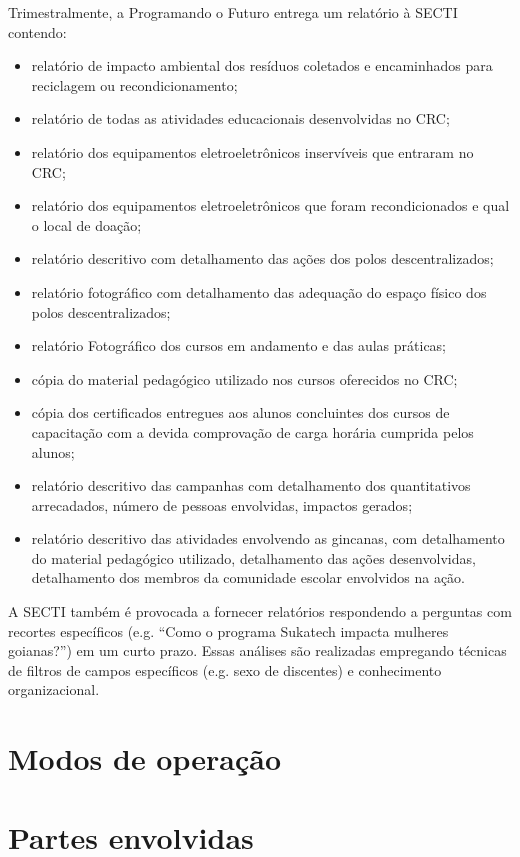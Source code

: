 \documentclass[
	12pt,				%
	openright,			%
	twoside,			%
	a4paper,			%
	english,			%
	french,				%
	spanish,			%
	brazil,				%
	]{abntex2}
\begin{document}
Trimestralmente, a Programando o Futuro entrega um relatório à SECTI contendo:

\begin{itemize}
  \item relatório de impacto ambiental dos resíduos coletados e encaminhados para reciclagem ou recondicionamento;
  \item relatório de todas as atividades educacionais desenvolvidas no CRC;
  \item relatório dos equipamentos eletroeletrônicos inservíveis que entraram no CRC;
  \item relatório dos equipamentos eletroeletrônicos que foram recondicionados e qual o local de doação;
  \item relatório descritivo com detalhamento das ações dos polos descentralizados;
  \item relatório fotográfico com detalhamento das adequação do espaço físico dos polos descentralizados;
  \item relatório Fotográfico dos cursos em andamento e das aulas práticas;
  \item cópia do material pedagógico utilizado nos cursos oferecidos no CRC;
  \item cópia dos certificados entregues aos alunos concluintes dos cursos de capacitação com a devida comprovação de carga horária cumprida pelos alunos;
  \item relatório descritivo das campanhas com detalhamento dos quantitativos arrecadados, número de pessoas envolvidas, impactos gerados;
  \item relatório descritivo das atividades envolvendo as gincanas, com detalhamento do material pedagógico utilizado, detalhamento das ações desenvolvidas, detalhamento dos membros da comunidade escolar envolvidos na ação.
\end{itemize}

A SECTI também é provocada a fornecer relatórios respondendo a perguntas com recortes específicos (e.g. ``Como o programa Sukatech impacta mulheres goianas?'') em um curto prazo. Essas análises são realizadas empregando técnicas de filtros de campos específicos (e.g. sexo de discentes) e conhecimento organizacional.

\section{Modos de operação}

\section{Partes envolvidas}
\end{document}
